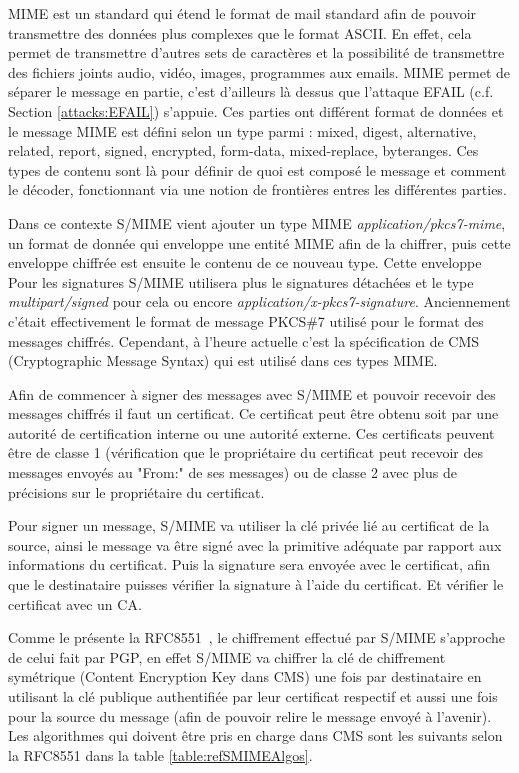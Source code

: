 MIME est un standard qui étend le format de mail standard afin de pouvoir transmettre des données plus complexes que le format ASCII. En effet, cela permet de transmettre d'autres sets de caractères et la possibilité de transmettre des fichiers joints audio, vidéo, images, programmes aux emails. MIME permet de séparer le message en partie, c'est d'ailleurs là dessus que l'attaque EFAIL (c.f. Section \ref{attacks:EFAIL}) s'appuie. Ces parties ont différent format de données et le message MIME est défini selon un type parmi : mixed, digest, alternative, related, report, signed, encrypted, form-data, mixed-replace, byteranges. Ces types de contenu sont là pour définir de quoi est composé le message et comment le décoder, fonctionnant via une notion de frontières entres les différentes parties.

Dans ce contexte S/MIME vient ajouter un type MIME \textit{application/pkcs7-mime}, un format de donnée qui enveloppe une entité MIME afin de la chiffrer, puis cette enveloppe chiffrée est ensuite le contenu de ce nouveau type. Cette enveloppe  Pour les signatures S/MIME utilisera plus le signatures détachées et le type \textit{multipart/signed} pour cela ou encore \textit{application/x-pkcs7-signature}. Anciennement c'était effectivement le format de message PKCS\#7 utilisé pour le format des messages chiffrés. Cependant, à l'heure actuelle c'est la spécification de CMS (Cryptographic Message Syntax) qui est utilisé dans ces types MIME.

Afin de commencer à signer des messages avec S/MIME et pouvoir recevoir des messages chiffrés il faut un certificat. Ce certificat peut être obtenu soit par une autorité de certification interne ou une autorité externe. Ces certificats peuvent être de classe 1 (vérification que le propriétaire du certificat peut recevoir des messages envoyés au "From:" de ses messages) ou de classe 2 avec plus de précisions sur le propriétaire du certificat.

Pour signer un message, S/MIME va utiliser la clé privée lié au certificat de la source, ainsi le message va être signé avec la primitive adéquate par rapport aux informations du certificat. Puis la signature sera envoyée avec le certificat, afin que le destinataire puisses vérifier la signature à l'aide du certificat. Et vérifier le certificat avec un CA.

Comme le présente la RFC8551~\cite{RFC8551}, le chiffrement effectué par S/MIME s'approche de celui fait par PGP, en effet S/MIME va chiffrer la clé de chiffrement symétrique (Content Encryption Key dans CMS) une fois par destinataire en utilisant la clé publique authentifiée par leur certificat respectif et aussi une fois pour la source du message (afin de pouvoir relire le message envoyé à l'avenir). Les algorithmes qui doivent être pris en charge dans CMS sont les suivants selon la RFC8551 dans la table \ref{table:refSMIMEAlgos}.


